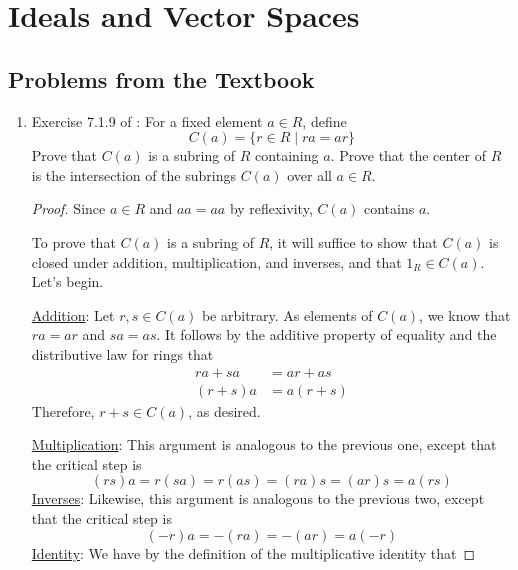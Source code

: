 \documentclass[../psets.tex]{subfiles}
\begin{document}
\section{Ideals and Vector Spaces}
\subsection*{Problems from the Textbook}
\begin{enumerate}
    \item {}Exercise 7.1.9 of \textcite{bib:DummitFoote}: For a fixed element $a\in R$, define
    \begin{equation*}
        C(a) = \{r\in R\mid ra=ar\}
    \end{equation*}
    Prove that $C(a)$ is a subring of $R$ containing $a$. Prove that the center of $R$ is the intersection of the subrings $C(a)$ over all $a\in R$.
    \begin{proof}
        Since $a\in R$ and $aa=aa$ by reflexivity, $C(a)$ contains $a$.\par\smallskip
        To prove that $C(a)$ is a subring of $R$, it will suffice to show that $C(a)$ is closed under addition, multiplication, and inverses, and that $1_R\in C(a)$. Let's begin.\par
        \underline{Addition}: Let $r,s\in C(a)$ be arbitrary. As elements of $C(a)$, we know that $ra=ar$ and $sa=as$. It follows by the additive property of equality and the distributive law for rings that
        \begin{align*}
            ra+sa &= ar+as\\
            (r+s)a &= a(r+s)
        \end{align*}
        Therefore, $r+s\in C(a)$, as desired.\par
        \underline{Multiplication}: This argument is analogous to the previous one, except that the critical step is
        \begin{equation*}
            (rs)a = r(sa)
            = r(as)
            = (ra)s
            = (ar)s
            = a(rs)
        \end{equation*}
        \underline{Inverses}: Likewise, this argument is analogous to the previous two, except that the critical step is
        \begin{equation*}
            (-r)a = -(ra)
            = -(ar)
            = a(-r)
        \end{equation*}
        \underline{Identity}: We have by the definition of the multiplicative identity that

\end{proof}
\end{enumerate}
\end{document}
